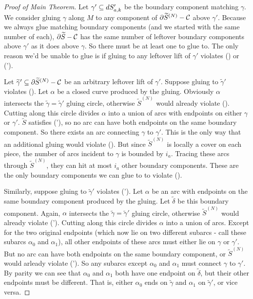 \begin{proof}[Proof of Main Theorem]
Let $\gamma' \subseteq dS_{a,k}'$ be the boundary component matching $\gamma$. We
consider gluing $\gamma$ along $M$ to any component of $\partial\widetilde{S}^{(N)}
- \mathcal{C}$ above $\gamma'$.  Because we always glue matching boundary components
(and we started with the same number of each), $\partial\widetilde{S} - \mathcal{C}$ has the
same number of leftover boundary components above $\gamma'$ as it does above
$\gamma$. So there must be at least one to glue to.  The only reason we'd be
unable to glue is if gluing to any leftover lift of $\gamma'$ violates (\dag) or
(\dag').

Let $\widetilde{\gamma}' \subseteq \partial\widetilde{S}^{(N)} - \mathcal{C}$ be an arbitrary
leftover lift of $\gamma'$.  Suppose gluing to $\widetilde{\gamma}'$ violates
(\dag). Let $\alpha$ be a closed curve produced by the gluing.  Obviously
$\alpha$ intersects the $\widetilde{\gamma} = \widetilde{\gamma}'$ gluing
circle, otherwise $\widetilde{S}^{(N)}$ would already violate (\dag).  Cutting
along this circle divides $\alpha$ into a union of arcs with endpoints on
either $\gamma$ or $\gamma'$.  $\widetilde{S}$ satisfies (\dag'), so no arc can
have both endpoints on the same boundary component. So there exists an arc
connecting $\gamma$ to $\gamma'$. This is the only way that an additional
gluing would violate (\dag). But since $\widetilde{S}^{(N)}$ is locally a cover
on each piece, the number of arcs incident to $\gamma$ is bounded by $i_a$.
Tracing these arcs through $\widetilde{S}^{(N)}$, they can hit at most $i_a$
other boundary components.  These are the only boundary components we can glue
to to violate (\dag).

Similarly, suppose gluing to $\widetilde{\gamma}'$ violates (\dag'). Let $\alpha$ be an
arc with endpoints on the same boundary component produced by the gluing. Let
$\widetilde{\delta}$ be this boundary component. Again, $\alpha$ intersects the
$\widetilde{\gamma} = \widetilde{\gamma}'$ gluing circle, otherwise $\widetilde{S}^{(N)}$ would already
violate (\dag').  Cutting along this circle divides $\alpha$ into a union of
arcs.  Except for the two original endpoints (which now lie on two different
subarcs - call these subarcs $\alpha_0$ and $\alpha_1$), all other endpoints of
these arcs must either lie on $\gamma$ or $\gamma'$.  But no arc can have both
endpoints on the same boundary component, or $\widetilde{S}^{(N)}$ would arleady violate
(\dag'). So any subarcs except $\alpha_0$ and $\alpha_1$ must connect $\gamma$ to
$\gamma'$.  By parity we can see that $\alpha_0$ and $\alpha_1$ both have one
endpoint on $\widetilde{\delta}$, but their other endpoints must be different. That is,
either $\alpha_0$ ends on $\widetilde{\gamma}$ and $\alpha_1$ on $\widetilde{\gamma}'$, or vice
versa.


\end{proof}
